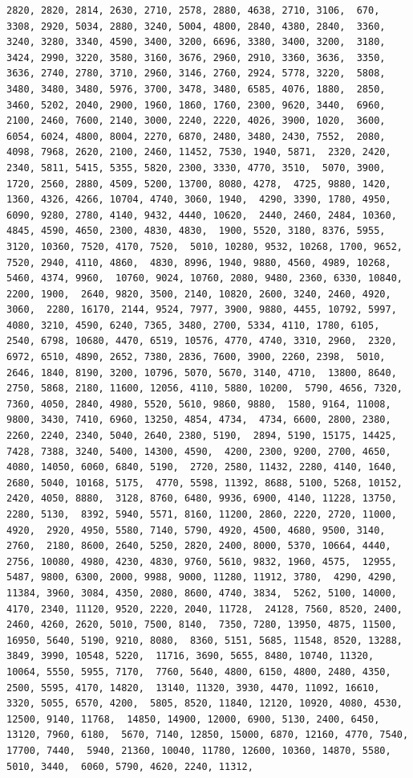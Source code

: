 \documentclass[
]{article}
\begin{document}
\begin{verbatim}
2820, 2820, 2814, 2630, 2710, 2578, 2880, 4638, 2710, 3106,  670, 3308, 2920, 5034, 2880, 3240, 5004, 4800, 2840, 4380, 2840,  3360, 3240, 3280, 3340, 4590, 3400, 3200, 6696, 3380, 3400, 3200,  3180, 3424, 2990, 3220, 3580, 3160, 3676, 2960, 2910, 3360, 3636,  3350, 3636, 2740, 2780, 3710, 2960, 3146, 2760, 2924, 5778, 3220,  5808, 3480, 3480, 3480, 5976, 3700, 3478, 3480, 6585, 4076, 1880,  2850, 3460, 5202, 2040, 2900, 1960, 1860, 1760, 2300, 9620, 3440,  6960, 2100, 2460, 7600, 2140, 3000, 2240, 2220, 4026, 3900, 1020,  3600, 6054, 6024, 4800, 8004, 2270, 6870, 2480, 3480, 2430, 7552,  2080, 4098, 7968, 2620, 2100, 2460, 11452, 7530, 1940, 5871,  2320, 2420, 2340, 5811, 5415, 5355, 5820, 2300, 3330, 4770, 3510,  5070, 3900, 1720, 2560, 2880, 4509, 5200, 13700, 8080, 4278,  4725, 9880, 1420, 1360, 4326, 4266, 10704, 4740, 3060, 1940,  4290, 3390, 1780, 4950, 6090, 9280, 2780, 4140, 9432, 4440, 10620,  2440, 2460, 2484, 10360, 4845, 4590, 4650, 2300, 4830, 4830,  1900, 5520, 3180, 8376, 5955, 3120, 10360, 7520, 4170, 7520,  5010, 10280, 9532, 10268, 1700, 9652, 7520, 2940, 4110, 4860,  4830, 8996, 1940, 9880, 4560, 4989, 10268, 5460, 4374, 9960,  10760, 9024, 10760, 2080, 9480, 2360, 6330, 10840, 2200, 1900,  2640, 9820, 3500, 2140, 10820, 2600, 3240, 2460, 4920, 3060,  2280, 16170, 2144, 9524, 7977, 3900, 9880, 4455, 10792, 5997,  4080, 3210, 4590, 6240, 7365, 3480, 2700, 5334, 4110, 1780, 6105,  2540, 6798, 10680, 4470, 6519, 10576, 4770, 4740, 3310, 2960,  2320, 6972, 6510, 4890, 2652, 7380, 2836, 7600, 3900, 2260, 2398,  5010, 2646, 1840, 8190, 3200, 10796, 5070, 5670, 3140, 4710,  13800, 8640, 2750, 5868, 2180, 11600, 12056, 4110, 5880, 10200,  5790, 4656, 7320, 7360, 4050, 2840, 4980, 5520, 5610, 9860, 9880,  1580, 9164, 11008, 9800, 3430, 7410, 6960, 13250, 4854, 4734,  4734, 6600, 2800, 2380, 2260, 2240, 2340, 5040, 2640, 2380, 5190,  2894, 5190, 15175, 14425, 7428, 7388, 3240, 5400, 14300, 4590,  4200, 2300, 9200, 2700, 4650, 4080, 14050, 6060, 6840, 5190,  2720, 2580, 11432, 2280, 4140, 1640, 2680, 5040, 10168, 5175,  4770, 5598, 11392, 8688, 5100, 5268, 10152, 2420, 4050, 8880,  3128, 8760, 6480, 9936, 6900, 4140, 11228, 13750, 2280, 5130,  8392, 5940, 5571, 8160, 11200, 2860, 2220, 2720, 11000, 4920,  2920, 4950, 5580, 7140, 5790, 4920, 4500, 4680, 9500, 3140, 2760,  2180, 8600, 2640, 5250, 2820, 2400, 8000, 5370, 10664, 4440,  2756, 10080, 4980, 4230, 4830, 9760, 5610, 9832, 1960, 4575,  12955, 5487, 9800, 6300, 2000, 9988, 9000, 11280, 11912, 3780,  4290, 4290, 11384, 3960, 3084, 4350, 2080, 8600, 4740, 3834,  5262, 5100, 14000, 4170, 2340, 11120, 9520, 2220, 2040, 11728,  24128, 7560, 8520, 2400, 2460, 4260, 2620, 5010, 7500, 8140,  7350, 7280, 13950, 4875, 11500, 16950, 5640, 5190, 9210, 8080,  8360, 5151, 5685, 11548, 8520, 13288, 3849, 3990, 10548, 5220,  11716, 3690, 5655, 8480, 10740, 11320, 10064, 5550, 5955, 7170,  7760, 5640, 4800, 6150, 4800, 2480, 4350, 2500, 5595, 4170, 14820,  13140, 11320, 3930, 4470, 11092, 16610, 3320, 5055, 6570, 4200,  5805, 8520, 11840, 12120, 10920, 4080, 4530, 12500, 9140, 11768,  14850, 14900, 12000, 6900, 5130, 2400, 6450, 13120, 7960, 6180,  5670, 7140, 12850, 15000, 6870, 12160, 4770, 7540, 17700, 7440,  5940, 21360, 10040, 11780, 12600, 10360, 14870, 5580, 5010, 3440,  6060, 5790, 4620, 2240, 11312, 
\end{verbatim}
\end{document}
